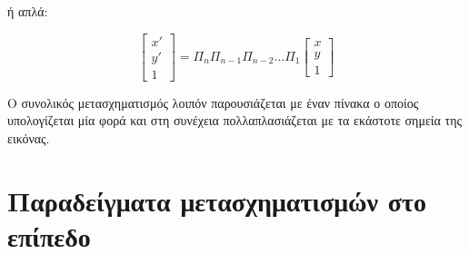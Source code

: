 ή απλά:

\[
\begin{bmatrix}
x' \\ y' \\ 1
\end{bmatrix}
=
\Pi_n \Pi_{n-1} \Pi_{n-2} \ldots \Pi_1
\begin{bmatrix}
x \\ y \\ 1
\end{bmatrix}
\]

Ο συνολικός μετασχηματισμός λοιπόν παρουσιάζεται με έναν πίνακα ο οποίος υπολογίζεται μία φορά και στη συνέχεια πολλαπλασιάζεται με τα εκάστοτε σημεία της εικόνας.

\section{Παραδείγματα μετασχηματισμών στο επίπεδο}











